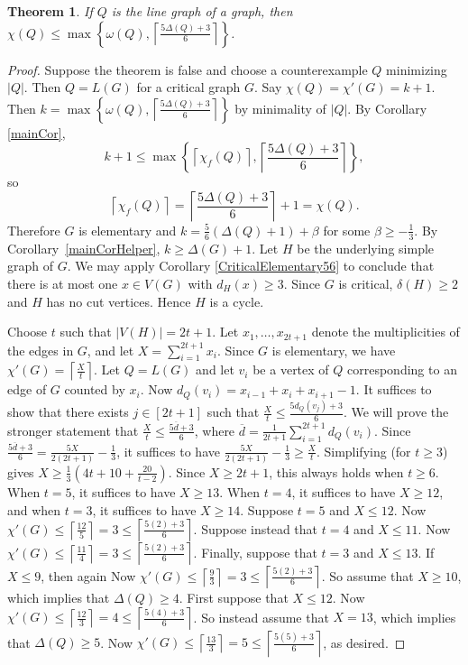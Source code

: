 \documentclass[12pt]{amsart}
\theoremstyle{plain}
\newtheorem{thm}{Theorem}
\theoremstyle{definition}
\theoremstyle{remark}
\newcommand{\set}[1]{\left\{ #1 \right\}}
\newcommand{\card}[1]{\left|#1\right|}
\newcommand{\ceil}[1]{\left\lceil#1\right\rceil}
\newcommand{\parens}[1]{\left( #1 \right)}
\begin{document}
\begin{thm}
If $Q$ is the line graph of a
graph, then $\chi(Q)\le \max\set{\omega(Q),\ceil{\frac{5\Delta(Q)+3}{6}}}$.
\end{thm}
\begin{proof}
Suppose the theorem is false and choose a counterexample $Q$ minimizing $\card{Q}$.  Then $Q = L(G)$ for a critical graph $G$.  Say $\chi(Q) = \chi'(G) = k + 1$.  Then
$k = \max\set{\omega(Q),\ceil{\frac{5\Delta(Q)+3}{6}}}$ by minimality of $\card{Q}$.  By Corollary \ref{mainCor},
\[k+1 \le \max\set{\ceil{\chi_f(Q)}, \ceil{\frac{5\Delta(Q)+3}{6}}},\]
so
\[\ceil{\chi_f(Q)} = \ceil{\frac{5\Delta(Q)+3}{6}} + 1 = \chi(Q).\]
Therefore $G$ is elementary and $k = \frac56\parens{\Delta(Q) + 1} + \beta$ for some $\beta \ge -\frac13$.  By Corollary~\ref{mainCorHelper}, $k \ge \Delta(G) + 1$.
Let $H$ be the underlying simple graph of $G$.
We may apply Corollary \ref{CriticalElementary56} to conclude that there is at most one $x \in V(G)$ with $d_H(x) \ge 3$.
Since $G$ is critical, $\delta(H) \ge 2$ and $H$ has no cut vertices. Hence $H$ is a cycle. 

Choose $t$ such that $|V(H)|=2t+1$.
Let $x_1,\ldots,x_{2t+1}$ denote the multiplicities of the edges in $G$, and let
$X=\sum_{i=1}^{2t+1}x_i$.  Since $G$ is elementary, we have
$\chi'(G)=\ceil{\frac{X}t}$.  
Let $Q=L(G)$ and let $v_i$ be a vertex of $Q$
corresponding to an edge of $G$ counted by $x_i$.  Now
$d_Q(v_i)=x_{i-1}+x_i+x_{i+1}-1$.  It suffices to show that there exists
$j\in[2t+1]$ such that $\frac{X}t\le \frac{5d_Q(v_j)+3}6$.  We will prove the
stronger statement that $\frac{X}t\le \frac{5\overline{d}+3}6$, where
$\overline{d}=\frac{1}{2t+1}\sum_{i=1}^{2t+1}d_Q(v_i)$.
Since $\frac{5\overline{d}+3}6 =\frac{5X}{2(2t+1)}-\frac13$, it suffices to have 
$\frac{5X}{2(2t+1)}-\frac13\ge \frac{X}t$.  Simplifying (for $t\ge 3$) gives $X\ge
\frac13(4t+10+\frac{20}{t-2})$.  Since $X\ge 2t+1$, this always holds when $t\ge
6$.  When $t=5$, it suffices to have $X\ge 13$.  When $t=4$, it suffices to have
$X\ge 12$, and when $t=3$, it suffices to have $X\ge 14$.  Suppose $t=5$ and
$X\le 12$.  
Now $\chi'(G)\le \ceil{\frac{12}5}=3\le\ceil{\frac{5(2)+3}6}$.
Suppose instead that $t=4$ and $X\le 11$.
Now $\chi'(G)\le \ceil{\frac{11}4}=3\le\ceil{\frac{5(2)+3}6}$.
Finally, suppose that $t=3$ and $X\le 13$.
If $X\le 9$, then again 
Now $\chi'(G)\le \ceil{\frac{9}3}=3\le\ceil{\frac{5(2)+3}6}$.
So assume that $X\ge 10$, which implies that $\Delta(Q)\ge 4$.
First suppose that $X\le 12$.
Now $\chi'(G)\le \ceil{\frac{12}3}=4\le\ceil{\frac{5(4)+3}6}$.
So instead assume that $X=13$, which implies that $\Delta(Q)\ge 5$.
Now $\chi'(G)\le \ceil{\frac{13}3}=5\le\ceil{\frac{5(5)+3}6}$, as desired.
\end{proof}
\end{document}
